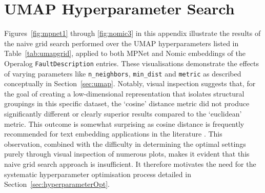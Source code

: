 \documentclass[10pt,oneside]{report}
\begin{document}
%

\section{UMAP Hyperparameter Search} \label{app:umaphypgrid}

Figures~\ref{fig:mpnet1} through \ref{fig:nomic3} in this appendix illustrate the results of the naive grid search performed over the UMAP hyperparameters listed in Table~\ref{tab:umapgrid}, applied to both MPNet and Nomic embeddings of the Operalog \texttt{FaultDescription} entries. These visualisations demonstrate the effects of varying parameters like \texttt{n\_neighbors}, \texttt{min\_dist} and \texttt{metric} as described conceptually in Section~\ref{sec:umap}. Notably, visual inspection suggests that, for the goal of creating a low-dimensional representation that isolates structural groupings in this specific dataset, the `cosine' distance metric did not produce significantly different or clearly superior results compared to the `euclidean' metric. This outcome is somewhat surprising as cosine distance is frequently recommended for text embedding applications in the literature \cite{cao2024recent, baba2017plagiarism}. This observation, combined with the difficulty in determining the optimal settings purely through visual inspection of numerous plots, makes it evident that this naive grid search approach is insufficient. It therefore motivates the need for the systematic hyperparameter optimisation process detailed in Section~\ref{sec:hyperparameterOpt}.
\end{document}
